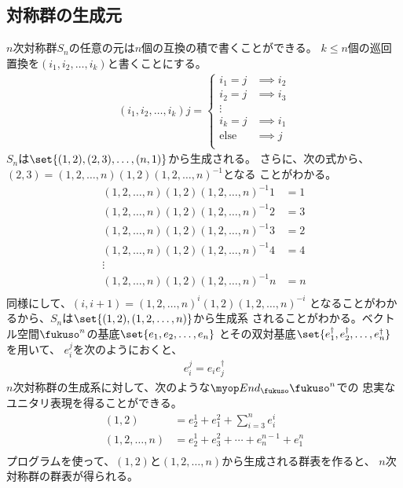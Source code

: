 \subsection{対称群の生成元}\label{s2:対称群の生成元} %
	$n$次対称群$S_n$の任意の元は$n$個の互換の積で書くことができる。
	$k\le n$個の巡回置換を$(i_1,i_2,\dots,i_k)$と書くことにする。
	\begin{equation*}\begin{split}
		(i_1,i_2,\dots,i_k)j = \begin{cases}
			i_1 = j &\implies i_2 \\
			i_2 = j &\implies i_3 \\
			\vdots \\
			i_k = j &\implies i_1 \\
			\text{else} &\implies j \\
		\end{cases}
	\end{split}\end{equation*}
	$S_n$は$\set{(1,2),(2,3),\dots,(n,1)}$から生成される。
	さらに、次の式から、$(2,3)=(1,2,\dots,n)(1,2)(1,2,\dots,n)^{-1}$となる
	ことがわかる。
	\begin{equation*}\begin{split}
		(1,2,\dots,n)(1,2)(1,2,\dots,n)^{-1}1 &= 1 \\
		(1,2,\dots,n)(1,2)(1,2,\dots,n)^{-1}2 &= 3 \\
		(1,2,\dots,n)(1,2)(1,2,\dots,n)^{-1}3 &= 2 \\
		(1,2,\dots,n)(1,2)(1,2,\dots,n)^{-1}4 &= 4 \\
		\vdots \\
		(1,2,\dots,n)(1,2)(1,2,\dots,n)^{-1}n &= n \\
	\end{split}\end{equation*}
	同様にして、$(i,i+1)=(1,2,\dots,n)^i(1,2)(1,2,\dots,n)^{-i}$
	となることがわかるから、$S_n$は$\set{(1,2),(1,2,\dots,n)}$から生成系
	されることがわかる。ベクトル空間$\fukuso^n$の基底$\set{e_1,e_2,\dots,e_n}$
	とその双対基底$\set{e_1^\dag,e_2^\dag,\dots,e_n^\dag}$を用いて、
	$e_i^j$を次のようにおくと、
	\begin{equation*}\begin{split}
		e_i^j = e_ie_j^\dag
	\end{split}\end{equation*}
	$n$次対称群の生成系に対して、次のような$\End_\fukuso\fukuso^n$での
	忠実なユニタリ表現を得ることができる。
	\begin{equation*}\begin{split}
		(1,2) &= e_2^1 + e_1^2 + \sum_{i=3}^ne_i^i \\
		(1,2,\dots,n) &= e_2^1 + e_3^2 + \cdots + e_n^{n-1} + e_1^n \\
	\end{split}\end{equation*}
	プログラムを使って、$(1,2)$と$(1,2,\dots,n)$から生成される群表を作ると、
	$n$次対称群の群表が得られる。

